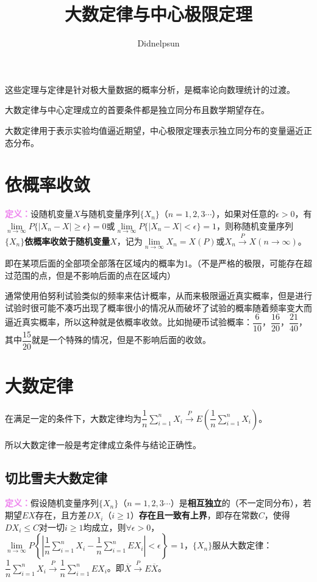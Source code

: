 \documentclass[UTF8, 12pt]{ctexart}
\author{Didnelpsun}
\title{大数定律与中心极限定理}
\date{}
\begin{document}
\maketitle
\pagestyle{empty}
\thispagestyle{empty}
\tableofcontents
\thispagestyle{empty}
\newpage
\pagestyle{plain}
\setcounter{page}{1}

这些定理与定律是针对极大量数据的概率分析，是概率论向数理统计的过渡。

大数定律与中心定理成立的首要条件都是独立同分布且数学期望存在。

大数定律用于表示实验均值逼近期望，中心极限定理表示独立同分布的变量逼近正态分布。

\section{依概率收敛}

\textcolor{violet}{\textbf{定义：}}设随机变量$X$与随机变量序列$\{X_n\}$（$n=1,2,3\cdots$），如果对任意的$\epsilon>0$，有$\lim\limits_{n\to\infty}P\{\vert X_n-X\vert\geqslant\epsilon\}=0$或$\lim\limits_{n\to\infty}P\{\vert X_n-X\vert<\epsilon\}=1$，则称随机变量序列$\{X_n\}$\textbf{依概率收敛于随机变量$X$}，记为$\lim\limits_{n\to\infty}X_n=X(P)$或$X_n\overset{P}{\rightarrow}X(n\to\infty)$。

即在某项后面的全部项全部落在区域内的概率为1。（不是严格的极限，可能存在超过范围的点，但是不影响后面的点在区域内）

通常使用伯努利试验类似的频率来估计概率，从而来极限逼近真实概率，但是进行试验时很可能不凑巧出现了概率很小的情况从而破坏了试验的概率随着频率变大而逼近真实概率，所以这种就是依概率收敛。比如抛硬币试验概率：$\dfrac{6}{10}$，$\dfrac{16}{20}$，$\dfrac{21}{40}$，其中$\dfrac{15}{20}$就是一个特殊的情况，但是不影响后面的收敛。

\section{大数定律}

在满足一定的条件下，大数定律均为$\dfrac{1}{n}\sum\limits_{i=1}^nX_i\overset{P}{\rightarrow}E\left(\dfrac{1}{n}\sum\limits_{i=1}^nX_i\right)$。

所以大数定律一般是考定律成立条件与结论正确性。

\subsection{切比雪夫大数定律}

\textcolor{violet}{\textbf{定义：}}假设随机变量序列$\{X_n\}$（$n=1,2,3\cdots$）是\textbf{相互独立}的（不一定同分布），若期望$EX$存在，且方差$DX_i$（$i\geqslant1$）\textbf{存在且一致有上界}，即存在常数$C$，使得$DX_i\leqslant C$对一切$i\geqslant1$均成立，则$\forall\epsilon>0$，$\lim\limits_{n\to\infty}P\left\{\left\vert\dfrac{1}{n}\sum\limits_{i=1}^nX_i-\dfrac{1}{n}\sum\limits_{i=1}^nEX_i\right\vert<\epsilon\right\}=1$，$\{X_n\}$服从大数定律：$\dfrac{1}{n}\sum\limits_{i=1}^nX_i\overset{P}{\longrightarrow}\dfrac{1}{n}\sum\limits_{i=1}^nEX_i$。即$\overline{X}\overset{P}{\rightarrow}E\overline{X}$。
\end{document}
